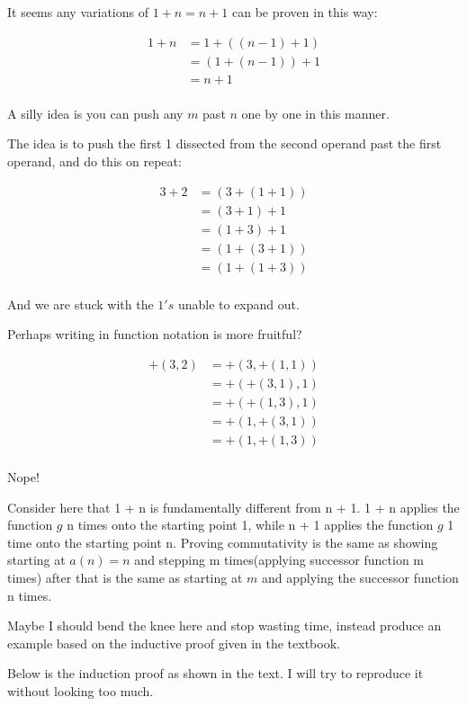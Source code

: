 \documentclass{article}
\begin{document}
\begin{enumerate}
It seems any variations of $1 + n = n + 1$ can be proven in this way:

\begin{align*}
	1 + n &= 1 + ((n - 1) + 1)\\
	&= (1 + (n - 1)) + 1\\
	&= n + 1\\
\end{align*}

A silly idea is you can push any $m$ past $n$ one by one in this manner.

The idea is to push the first 1 dissected from the second operand past the first operand, and do this on repeat:

\begin{align*}
	3 + 2 &= (3 + (1 + 1))\\
	&= (3 + 1) + 1\\
	&= (1 + 3) + 1\\
	&= (1 + (3 + 1))\\
	&= (1 + (1 + 3))\\
\end{align*}

And we are stuck with the $1's$ unable to expand out.

Perhaps writing in function notation is more fruitful?

\begin{align*}
	+(3,2) &= +(3,+(1,1))\\
	&= +(+(3,1),1)\\
	&= +(+(1,3),1)\\
	&= +(1,+(3,1))\\
	&= +(1,+(1,3))\\
\end{align*}

Nope!

\newpage
Consider here that 1 + n is fundamentally different from n + 1. 1 + n applies the function $g$ n times onto the starting point 1, while n + 1 applies the function $g$ 1 time onto the starting point n. Proving commutativity is the same as showing starting at $a(n) = n$ and stepping m times(applying successor function m times) after that is the same as starting at $m$ and applying the successor function n times.

\medskip
Maybe I should bend the knee here and stop wasting time, instead produce an example based on the inductive proof given in the textbook.

Below is the induction proof as shown in the text. I will try to reproduce it without looking too much.


\end{enumerate}
\end{document}
